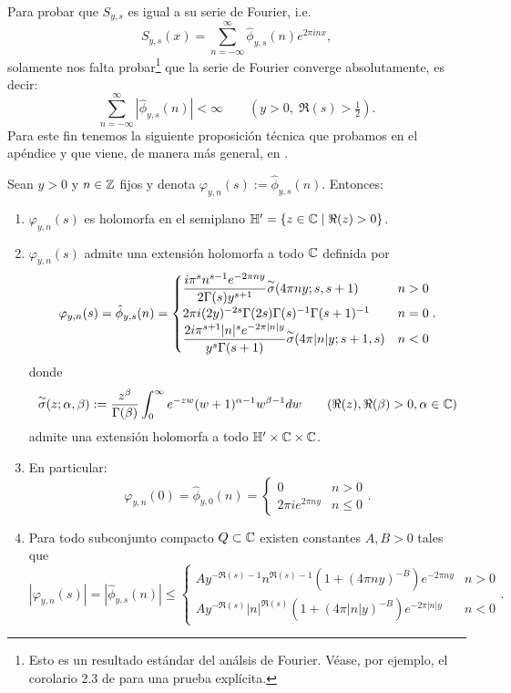 \documentclass[../../tesis_maestria]{subfiles}
\begin{document}
Para probar que $S_{y,s}$ es igual a su serie de Fourier, i.e.
\begin{equation}
  \label{eq:seriefourierS}
  S_{y,s}(x)=\sum_{n=-\infty}^{\infty}\hat{\phi}_{y,s}(n)e^{2\pi inx},
\end{equation}
solamente nos falta probar\footnote{Esto es un resultado est\'andar del
  an\'alsis de Fourier. V\'ease, por ejemplo, el corolario 2.3 de \cite{SteinFA}
para una prueba expl\'icita.} que la serie de Fourier converge absolutamente,
es decir:
\begin{equation}
  \label{eq:convabsphihat}
  \sum_{n=-\infty}^{\infty}|\hat{\phi}_{y,s}(n)|<\infty
  \qquad (y>0,\;\Re(s)>\tfrac{1}{2}).
\end{equation}
Para este fin tenemos la siguiente proposici\'on t\'ecnica que probamos en el ap\'endice
y que viene, de manera m\'as general, en \cite[\S7.2]{MiyakeMF}.

\begin{prop}\label{prop:de_phihat}
  Sean $y>0$ y $n\in\mathbb{Z}$ fijos y denota $\varphi_{y,n}(s):=\hat{\phi}_{y,s}(n)$. Entonces:
  \begin{enumerate}[label=\roman*)]
  \item $\varphi_{y,n}(s)$ es holomorfa en el semiplano $\mathbb{H}'=\{z\in\mathbb{C}\mid\Re(z)>0\}$.
  \item $\varphi_{y,n}(s)$ admite una extensi\'on holomorfa a todo $\mathbb{C}$ definida por
    \begin{equation}\label{eq:formulaphihat}
      \varphi_{y,n}(s)=\hat{\phi}_{y,s}(n)=
      \begin{cases}
        \dfrac{i\pi^sn^{s-1}e^{-2\pi ny}}{2\Gamma(s)y^{s+1}}\overset{\sim}{\sigma}(4\pi ny;s,s+1) &n>0\\
        2\pi i(2y)^{-2s}\Gamma(2s)\Gamma(s)^{-1}\Gamma(s+1)^{-1} &n=0\\
        \dfrac{2i\pi^{s+1}|n|^se^{-2\pi|n|y}}{y^s\Gamma(s+1)}\overset{\sim}{\sigma}(4\pi|n|y;s+1,s) &n<0
      \end{cases}.
    \end{equation}
    donde
    \[
      \overset{\sim}{\sigma}(z;\alpha,\beta):=\frac{z^{\beta}}{\Gamma(\beta)}\int_0^{\infty}e^{-zw}(w+1)^{\alpha-1}w^{\beta-1}dw
      \qquad(\Re(z),\Re(\beta)>0,\alpha\in\mathbb{C})
    \]
    admite  una extensi\'on holomorfa a todo $\mathbb{H}'\times\mathbb{C}\times\mathbb{C}$.
  \item\label{prop:inciso3} En particular:
    \[
      \varphi_{y,n}(0)=\hat{\phi}_{y,0}(n)=
      \begin{cases}
        0 & n>0\\
        2\pi i e^{2\pi ny} &n\leq0
      \end{cases}.
    \]
  \item\label{prop:inciso4} Para todo subconjunto compacto $Q\subset\mathbb{C}$ existen constantes $A,B>0$
    tales que
    \[
      |\varphi_{y,n}(s)|=|\hat{\phi}_{y,s}(n)|\leq
      \begin{cases}
        A y^{-\Re(s)-1}n^{\Re(s)-1}(1+(4\pi ny)^{-B})e^{-2\pi ny} & n>0\\
        A y^{-\Re(s)}|n|^{\Re(s)}(1+(4\pi |n|y)^{-B})e^{-2\pi|n|y} & n<0
      \end{cases}.
    \]
  \end{enumerate}
\end{prop}
\end{document}

